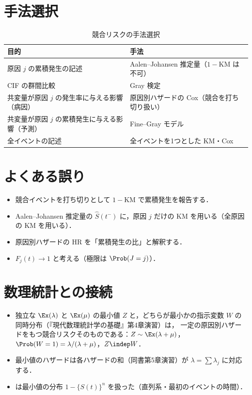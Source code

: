 \section{手法選択}\label{sec:11-choice}
\begin{table}[htbp]
\centering\small
\caption{競合リスクの手法選択}\label{tab:11-choice}
\begin{tabular}{@{}L{55mm}L{80mm}@{}}
\toprule
目的 & 手法\\
\midrule
原因 $j$ の累積発生の記述 & Aalen--Johansen 推定量（$1-\mathrm{KM}$ は不可）\\
CIF の群間比較 & Gray 検定\\
共変量が原因 $j$ の発生率に与える影響（病因） & 原因別ハザードの Cox（競合を打ち切り扱い）\\
共変量が原因 $j$ の累積発生に与える影響（予測） & Fine--Gray モデル\\
全イベントの記述 & 全イベントを1つとした KM・Cox\\
\bottomrule
\end{tabular}
\end{table}

\section{よくある誤り}\label{sec:11-err}
\begin{warnbox}
\begin{itemize}
\item 競合イベントを打ち切りとして $1-\mathrm{KM}$ で累積発生を報告する．
\item Aalen--Johansen 推定量の $\hat S(t^-)$ に，原因 $j$ だけの KM を用いる（全原因の KM を用いる）．
\item 原因別ハザードの HR を「累積発生の比」と解釈する．
\item $F_j(t)\to1$ と考える（極限は $\Prob(J=j)$）．
\end{itemize}
\end{warnbox}

\section{数理統計との接続}\label{sec:11-link}
\begin{linkbox}
\begin{itemize}
\item 独立な $\Ex(\lambda)$ と $\Ex(\mu)$ の最小値 $Z$ と，どちらが最小かの指示変数 $W$ の同時分布（『現代数理統計学の基礎』第4章演習）は，
      一定の原因別ハザードをもつ競合リスクそのものである：$Z\sim\Ex(\lambda+\mu)$，$\Prob(W=1)=\lambda/(\lambda+\mu)$，$Z\indep W$．
\item 最小値のハザードは各ハザードの和（同書第5章演習）が $\lambda=\sum\lambda_j$ に対応する．
\item {} は最小値の分布 $1-\{S(t)\}^n$ を扱った（直列系・最初のイベントの時間）．
\end{itemize}
\end{linkbox}

